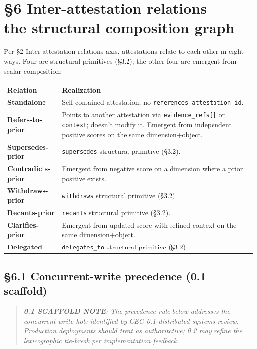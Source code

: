 \documentclass[10pt]{article}
\begin{document}
\clearpage


\section*{§6 Inter-attestation relations — the structural composition graph}


Per §2 Inter-attestation-relations axis, attestations relate to each other in eight ways. Four are structural primitives (§3.2); the other four are emergent from scalar composition:


{\footnotesize
\begin{longtable}{|p{8.0cm}|p{8.0cm}|}\hline
\textbf{Relation} & \textbf{Realization} \\ \hline\endhead
\textbf{Standalone} & Self-contained attestation; no \texttt{references\_attestation\_id}. \\ \hline
\textbf{Refers-to-prior} & Points to another attestation via \texttt{evidence\_refs[]} or \texttt{context}; doesn't modify it. Emergent from independent positive scores on the same dimension+object. \\ \hline
\textbf{Supersedes-prior} & \texttt{supersedes} structural primitive (§3.2). \\ \hline
\textbf{Contradicts-prior} & Emergent from negative score on a dimension where a prior positive exists. \\ \hline
\textbf{Withdraws-prior} & \texttt{withdraws} structural primitive (§3.2). \\ \hline
\textbf{Recants-prior} & \texttt{recants} structural primitive (§3.2). \\ \hline
\textbf{Clarifies-prior} & Emergent from updated score with refined context on the same dimension+object. \\ \hline
\textbf{Delegated} & \texttt{delegates\_to} structural primitive (§3.2). \\ \hline
\end{longtable}}


\subsection*{§6.1 Concurrent-write precedence (0.1 scaffold)}


\begin{quote}\itshape \textbf{0.1 SCAFFOLD NOTE}: The precedence rule below addresses the concurrent-write hole identified by CEG 0.1 distributed-systems review. Production deployments should treat as authoritative; 0.2 may refine the lexicographic tie-break per implementation feedback.\end{quote}
\end{document}
